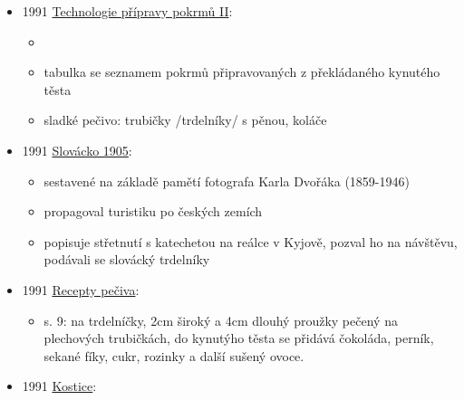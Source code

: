\begin{itemize}
  \begin{itemize}
  \tightlist
  \item
    s. 19: Za starých časů: Jak se v Pašovicích bydlívalo. Vypráví Jakub
    Zajíc.
  \item
    popis pece s možností pečení trdelníku v Pašovicích (severně od
    Uherskýho Brodu)
  \item
    trdelník na pečení trdláčů
  \end{itemize}
\item
  1991
  \href{https://ceskadigitalniknihovna.cz/uuid/uuid:2e23e200-3d6d-11e3-9c86-005056827e51}{Technologie
  přípravy pokrmů II}:

  \begin{itemize}
  \tightlist
  \item
  \item
    tabulka se seznamem pokrmů připravovaných z překládaného kynutého
    těsta
  \item
    sladké pečivo: trubičky /trdelníky/ s pěnou, koláče
  \end{itemize}
\item
  1991
  \href{https://ceskadigitalniknihovna.cz/uuid/uuid:f87ff390-1ab3-11e3-9319-005056827e51}{Slovácko
  1905}:

  \begin{itemize}
  \tightlist
  \item
    sestavené na základě pamětí fotografa Karla Dvořáka (1859-1946)
  \item
    propagoval turistiku po českých zemích
  \item
    popisuje střetnutí s katechetou na reálce v Kyjově, pozval ho na
    návštěvu, podávali se slovácký trdelníky
  \end{itemize}
\item
  1991
  \href{https://www.digitalniknihovna.cz/mzk/uuid/uuid:ff7ac050-07b1-11e7-9446-005056827e51}{Recepty
  pečiva}:

  \begin{itemize}
  \tightlist
  \item
    s. 9:  na trdelníčky, 2cm široký a 4cm dlouhý
    proužky pečený na plechových trubičkách, do kynutýho těsta se
    přidává čokoláda, perník, sekané fíky, cukr, rozinky a další sušený
    ovoce.
  \end{itemize}
\item
  1991
  \href{https://ndk.cz/uuid/uuid:845e3cd5-1602-11f1-81c1-7eb38507f91c}{Kostice}:


\end{itemize}

